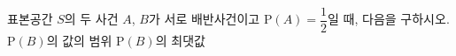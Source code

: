 표본공간 $S$의 두 사건 $A$, $B$가 서로 배반사건이고 $\mathrm{P}(A)=\dfrac{1}{2}$일 때, 다음을 구하시오.
 $\mathrm{P}(B)$의 값의 범위
 $\mathrm{P}(B)$의 최댓값
